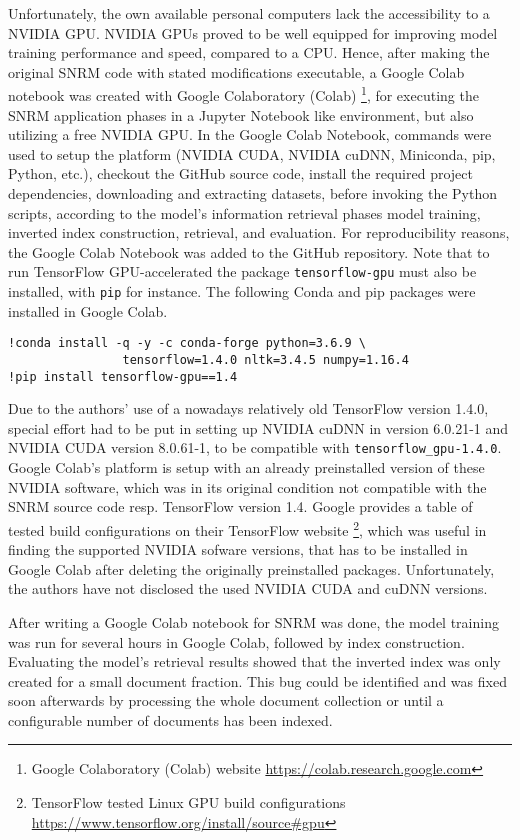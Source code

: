 Unfortunately, the own available personal computers lack the accessibility to a NVIDIA GPU.
NVIDIA GPUs proved to be well equipped for improving model training performance and speed, compared to a CPU.
Hence, after making the original SNRM code with stated modifications executable, a Google Colab notebook was created
    with Google Colaboratory (Colab) \footnote{Google Colaboratory (Colab) website \url{https://colab.research.google.com}},
    for executing the SNRM application phases in a Jupyter Notebook like environment, 
    but also utilizing a free NVIDIA GPU.
In the Google Colab Notebook, commands were used to setup the platform (NVIDIA CUDA, NVIDIA cuDNN, Miniconda, pip, Python, etc.),
    checkout the GitHub source code,
    install the required project dependencies, downloading and extracting datasets,
    before invoking the Python scripts, according to the model's information retrieval phases
    model training, inverted index construction, retrieval, and evaluation.
For reproducibility reasons, the Google Colab Notebook was added to the GitHub repository.
Note that to run TensorFlow GPU-accelerated the package \verb|tensorflow-gpu| must also be installed,
    with \verb|pip| for instance.
The following Conda and pip packages were installed in Google Colab.
\begin{verbatim}
!conda install -q -y -c conda-forge python=3.6.9 \
                tensorflow=1.4.0 nltk=3.4.5 numpy=1.16.4
!pip install tensorflow-gpu==1.4
\end{verbatim}

Due to the authors' use of a nowadays relatively old TensorFlow version 1.4.0, special effort had to be put in setting up
    NVIDIA cuDNN in version 6.0.21-1 and NVIDIA CUDA version 8.0.61-1, to be compatible with \verb|tensorflow_gpu-1.4.0|.
Google Colab's platform is setup with an already preinstalled version of these NVIDIA software, which was in its original condition
    not compatible with the SNRM source code resp. TensorFlow version 1.4.
Google provides a table of tested build configurations on their TensorFlow website
    \footnote{TensorFlow tested Linux GPU build configurations \url{https://www.tensorflow.org/install/source\#gpu}}, 
    which was useful in finding the supported NVIDIA sofware versions, that has to be installed in Google Colab 
    after deleting the originally preinstalled packages.
Unfortunately, the authors have not disclosed the used NVIDIA CUDA and cuDNN versions.

After writing a Google Colab notebook for SNRM was done, the model training was run for several hours in Google Colab,
    followed by index construction.
Evaluating the model's retrieval results showed that the inverted index was only created for a small document fraction.
This bug could be identified and was fixed soon afterwards by processing the whole document collection or until a
    configurable number of documents has been indexed.

